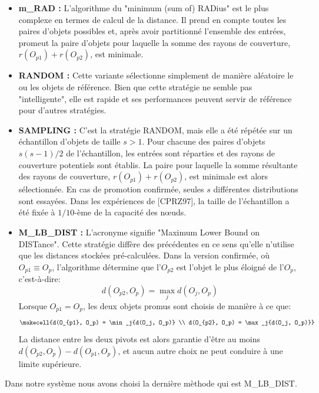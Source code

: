 \begin{itemize}
	\item \textbf{m\_RAD :} L'algorithme du "minimum (sum of) RADius" est le plus complexe en termes de calcul de la distance. Il prend en compte toutes les paires d'objets possibles et, après avoir partitionné l'ensemble des entrées, promeut la paire d'objets pour laquelle la somme des rayons de couverture, $ r(O_{p1}) + r(O_{p2}) $, est minimale.
	\item \textbf{RANDOM :} Cette variante sélectionne simplement de manière aléatoire le ou les objets de référence.
	Bien que cette stratégie ne semble pas "intelligente", elle est rapide et ses performances peuvent servir de référence pour d'autres stratégies.
	\item \textbf{SAMPLING :} C'est la stratégie RANDOM, mais elle a été répétée sur un échantillon d'objets de taille $ s > 1 $. Pour chacune des paires d'objets $ s(s - 1)/2 $ de l'échantillon, les entrées sont réparties et des rayons de couverture potentiels sont établis. La paire pour laquelle la somme résultante des rayons de couverture, $ r(O_{p1})+r(O_{p2}) $, est minimale est alors sélectionnée.
	En cas de promotion confirmée, seules $ s $ différentes distributions sont essayées. Dans les expériences de [CPRZ97], la taille de l'échantillon a été fixée à $ 1/10 $-ème de la capacité des nœuds.
	\item \textbf{M\_LB\_DIST :} L'acronyme signifie "Maximum Lower Bound on DISTance".
	Cette stratégie diffère des précédentes en ce sens qu'elle n'utilise que les distances stockées pré-calculées. Dans la version confirmée, où $ O_{p1} \equiv O_p $, l'algorithme détermine que l'$ O_{p2} $ est l'objet le plus éloigné de l'$ O_p $, c'est-à-dire:
	\begin{equation}
		 d(O_{p2}, O_p) = \max_j{d(O_j, O_p)}
	\end{equation}
	Lorsque $ O_{p1} = O_p $, les deux objets promus sont choisis de manière à ce que:
	\begin{equation}
	\makecell{d(O_{p1}, O_p) = \min_j{d(O_j, O_p)} \\
		 d(O_{p2}, O_p) = \max_j{d(O_j, O_p)}}
	\end{equation}
	La distance entre les deux pivots est alors garantie d'être au moins\\ $ d(O_{p2}, O_p)-d(O_{p1}, O_p) $, et aucun autre choix ne peut conduire à une limite supérieure.
\end{itemize}
Dans notre système nous avons choisi la dernière mèthode qui est M\_LB\_DIST.


